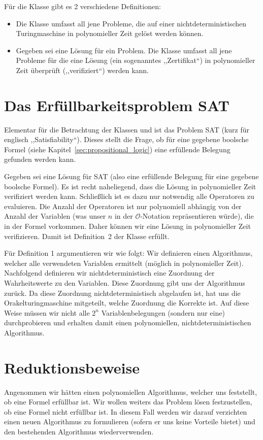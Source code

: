 Für die Klasse \cNP{} gibt es 2 verschiedene Definitionen:
\begin{itemize}
  \item Die Klasse \cNP{} umfasst all jene Probleme, die auf einer nichtdeterministischen Turingmaschine in polynomieller Zeit gelöst werden können.
  \item Gegeben sei eine Lösung für ein Problem. Die Klasse \cNP{} umfasst all jene Probleme für die eine Lösung (ein sogenanntes ,,Zertifikat``) in polynomieller Zeit überprüft (,,verifiziert``) werden kann.
\end{itemize}

\section{Das Erfüllbarkeitsproblem SAT}
%
Elementar für die Betrachtung der Klassen \cP{} und \cNP{} ist das Problem SAT (kurz für englisch ,,Satisfiability``). Dieses stellt die Frage, ob für eine gegebene boolsche Formel (siehe Kapitel~\ref{sec:propositional_logic}) eine erfüllende Belegung gefunden werden kann.

Gegeben sei eine Lösung für SAT (also eine erfüllende Belegung für eine gegebene boolsche Formel). Es ist recht naheliegend, dass die Lösung in polynomieller Zeit verifiziert werden kann. Schließlich ist es dazu nur notwendig alle Operatoren zu evaluieren. Die Anzahl der Operatoren ist nur polynomiell abhängig von der Anzahl der Variablen (was unser $n$ in der $\mathcal{O}$-Notation repräsentieren würde), die in der Formel vorkommen. Daher können wir eine Lösung in polynomieller Zeit verifizieren. Damit ist Definition~2 der Klasse \cNP{} erfüllt.

Für Definition 1 argumentieren wir wie folgt: Wir definieren einen Algorithmus, welcher alle verwendeten Variablen ermittelt (möglich in polynomieller Zeit). Nachfolgend definieren wir nichtdeterministisch eine Zuordnung der Wahrheitswerte zu den Variablen. Diese Zuordnung gibt uns der Algorithmus zurück. Da diese Zuordnung nichtdeterministisch abgelaufen ist, hat uns die Orakelturingmaschine mitgeteilt, welche Zuordnung die Korrekte ist. Auf diese Weise müssen wir nicht alle $2^n$ Variablenbelegungen (sondern nur eine) durchprobieren und erhalten damit einen polynomiellen, nichtdeterministischen Algorithmus.

\section{Reduktionsbeweise}
%
Angenommen wir hätten einen polynomiellen Algorithmus, welcher uns feststellt, ob eine Formel erfüllbar ist. Wir wollen weiters das Problem lösen festzustellen, ob eine Formel nicht erfüllbar ist. In diesem Fall werden wir darauf verzichten einen neuen Algorithmus zu formulieren (sofern er uns keine Vorteile bietet) und den bestehenden Algorithmus wiederverwenden.

